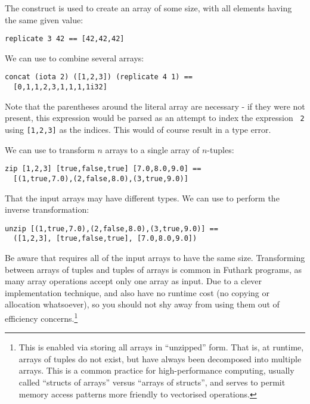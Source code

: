 \documentclass[oneside,11pt]{book}
\begin{document}
The  construct is used to create an array of some
size, with all elements having the same given value:

\begin{lstlisting}
replicate 3 42 == [42,42,42]
\end{lstlisting}

We can use  to combine several arrays:

\begin{lstlisting}
concat (iota 2) ([1,2,3]) (replicate 4 1) ==
  [0,1,1,2,3,1,1,1,1i32]
\end{lstlisting}

Note that the parentheses around the literal array are necessary - if
they were not present, this expression would be parsed as an attempt
to index the expression \texttt{ 2} using \texttt{[1,2,3]} as the
indices.  This would of course result in a type error.

We can use  to transform $n$ arrays to a single array of
$n$-tuples:

\begin{lstlisting}
zip [1,2,3] [true,false,true] [7.0,8.0,9.0] ==
  [(1,true,7.0),(2,false,8.0),(3,true,9.0)]
\end{lstlisting}

That the input arrays may have different types.  We can use
 to perform the inverse transformation:

\begin{lstlisting}
unzip [(1,true,7.0),(2,false,8.0),(3,true,9.0)] ==
  ([1,2,3], [true,false,true], [7.0,8.0,9.0])
\end{lstlisting}

Be aware that  requires all of the input arrays to have
the same size.  Transforming between arrays of tuples and tuples of
arrays is common in Futhark programs, as many array operations accept
only one array as input.  Due to a clever implementation technique,
 and  also have no runtime cost (no copying
or allocation whatsoever), so you should not shy away from using them
out of efficiency concerns.\footnote{This is enabled via storing all
  arrays in ``unzipped'' form.  That is, at runtime, arrays of tuples
  do not exist, but have always been decomposed into multiple arrays.
  This is a common practice for high-performance computing, usually
  called ``structs of arrays'' versus ``arrays of structs'', and
  serves to permit memory access patterns more friendly to vectorised
  operations.}
\end{document}
